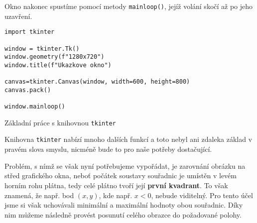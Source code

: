 Okno nakonec spustíme pomocí metody \texttt{mainloop()}, jejíž volání skočí až po jeho uzavření.
\begin{program}[h]
\begin{lstlisting}[style=python]
import tkinter

window = tkinter.Tk()
window.geometry(f"1280x720")
window.title(f"Ukazkove okno")

canvas=tkinter.Canvas(window, width=600, height=800)
canvas.pack()

window.mainloop()
\end{lstlisting}
    \caption{Základní práce s knihovnou \texttt{tkinter}}
    \label{prog:tkinter-zaklad}
\end{program}

Knihovna \texttt{tkinter} nabízí mnoho dalších funkcí a toto nebyl ani zdaleka základ v pravém slova smyslu, nicméně bude to pro naše potřeby dostačující.

Problém, s nímž se však nyní potřebujeme vypořádat, je zarovnání obrázku na střed grafického okna, neboť počátek soustavy souřadnic je umístěn v levém horním rohu plátna, tedy celé plátno tvoří její \textbf{první kvadrant}. To však znamená, že např. bod $(x,y)$, kde např. $x<0$, nebude viditelný. Pro tento účel jsme si však uchovávali minimální a maximální hodnoty obou souřadnic. Díky nim můžeme následně provést posunutí celého obrazce do požadované polohy.

